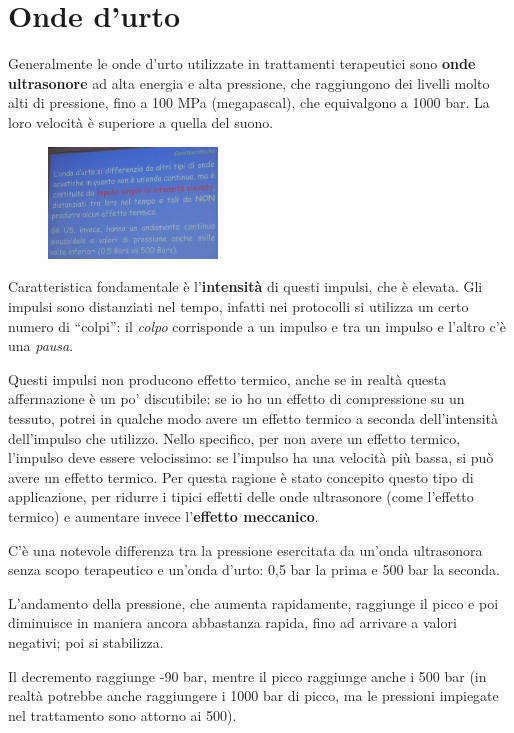 \section{Onde d'urto}

Generalmente le onde d'urto utilizzate in trattamenti terapeutici sono
\textbf{onde ultrasonore} ad alta energia e alta pressione, che
raggiungono dei livelli molto alti di pressione, fino a 100 MPa
(megapascal), che equivalgono a 1000 bar. La loro velocità è superiore a
quella del suono.

\begin{figure}[!ht]
\centering
\includegraphics[width=0.4\textwidth]{025/image1.jpeg}
\end{figure}

Caratteristica fondamentale è l'\textbf{intensità} di questi impulsi,
che è elevata. Gli impulsi sono distanziati nel tempo, infatti nei
protocolli si utilizza un certo numero di ``colpi'': il \emph{colpo}
corrisponde a un impulso e tra un impulso e l'altro c'è una
\emph{pausa}.

Questi impulsi non producono effetto termico, anche se in realtà questa
affermazione è un po' discutibile: se io ho un effetto di compressione
su un tessuto, potrei in qualche modo avere un effetto termico a seconda
dell'intensità dell'impulso che utilizzo. Nello specifico, per non avere
un effetto termico, l'impulso deve essere velocissimo: se l'impulso ha
una velocità più bassa, si può avere un effetto termico. Per questa
ragione è stato concepito questo tipo di applicazione, per ridurre i
tipici effetti delle onde ultrasonore (come l'effetto termico) e
aumentare invece l'\textbf{effetto meccanico}.

C'è una notevole differenza tra la pressione esercitata da un'onda
ultrasonora senza scopo terapeutico e un'onda d'urto: 0,5 bar la prima e
500 bar la seconda.

L'andamento della pressione, che aumenta rapidamente, raggiunge il picco
e poi diminuisce in maniera ancora abbastanza rapida, fino ad arrivare a
valori negativi; poi si stabilizza.

Il decremento raggiunge -90 bar, mentre il picco raggiunge anche i 500
bar (in realtà potrebbe anche raggiungere i 1000 bar di picco, ma le
pressioni impiegate nel trattamento sono attorno ai 500).

